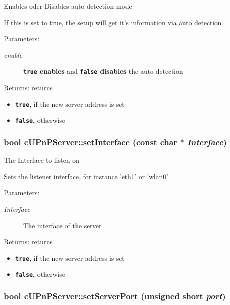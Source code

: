 Enables oder Disables auto detection mode

If this is set to true, the setup will get it's information via auto detection

\begin{Desc}
\item[Parameters:]
\begin{description}
\item[{\em enable}]{\bf {\tt true} enables} and {\bf {\tt false} disables} the auto detection \end{description}
\end{Desc}
\begin{Desc}
\item[Returns:]returns\begin{itemize}
\item {\bf {\tt true},} if the new server address is set\item {\bf {\tt false},} otherwise \end{itemize}
\end{Desc}
\hypertarget{classcUPnPServer_81cf9d85c09093094febe6966a568702}{
\subsubsection[{setInterface}]{\setlength{\rightskip}{0pt plus 5cm}bool cUPnPServer::setInterface (const char $\ast$ {\em Interface})}}
\label{classcUPnPServer_81cf9d85c09093094febe6966a568702}


The Interface to listen on

Sets the listener interface, for instance 'eth1' or 'wlan0'

\begin{Desc}
\item[Parameters:]
\begin{description}
\item[{\em Interface}]The interface of the server \end{description}
\end{Desc}
\begin{Desc}
\item[Returns:]returns\begin{itemize}
\item {\bf {\tt true},} if the new server address is set\item {\bf {\tt false},} otherwise \end{itemize}
\end{Desc}
\hypertarget{classcUPnPServer_77494ce55a93601110bd4ffce8559b23}{
\subsubsection[{setServerPort}]{\setlength{\rightskip}{0pt plus 5cm}bool cUPnPServer::setServerPort (unsigned short {\em port})}}
\label{classcUPnPServer_77494ce55a93601110bd4ffce8559b23}


